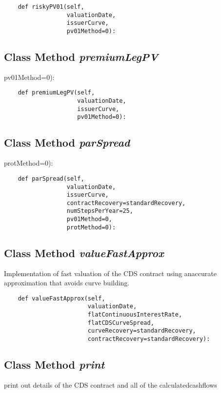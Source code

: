 \documentclass[twoside,11pt]{book}
\begin{document}
\begin{lstlisting}
    def riskyPV01(self,
                  valuationDate,
                  issuerCurve,
                  pv01Method=0):
\end{lstlisting}

\subsection{Class Method {\it premiumLegPV}}
pv01Method=0):

\begin{lstlisting}
    def premiumLegPV(self,
                     valuationDate,
                     issuerCurve,
                     pv01Method=0):
\end{lstlisting}

\subsection{Class Method {\it parSpread}}
protMethod=0):

\begin{lstlisting}
    def parSpread(self,
                  valuationDate,
                  issuerCurve,
                  contractRecovery=standardRecovery,
                  numStepsPerYear=25,
                  pv01Method=0,
                  protMethod=0):
\end{lstlisting}

\subsection{Class Method {\it valueFastApprox}}
Implementation of fast valuation of the CDS contract using anaccurate approximation that avoids curve building. 

\begin{lstlisting}
    def valueFastApprox(self,
                        valuationDate,
                        flatContinuousInterestRate,
                        flatCDSCurveSpread,
                        curveRecovery=standardRecovery,
                        contractRecovery=standardRecovery):
\end{lstlisting}

\subsection{Class Method {\it print}}
print out details of the CDS contract and all of the calculatedcashflows 
\end{document}
